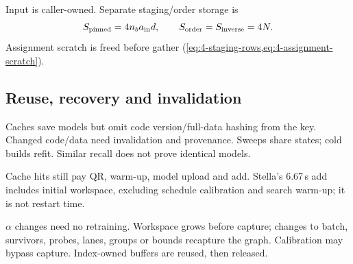 Input is caller-owned. Separate staging/order storage is
\[
 S_{\rm pinned}=4n_ba_{\rm in}d,\qquad
 S_{\rm order}=S_{\rm inverse}=4N.
\]
Assignment scratch is freed before gather (\cref{eq:4-staging-rows,eq:4-assignment-scratch}).

\subsection{Reuse, recovery and invalidation}

Caches save models but omit code version/full-data hashing from the key. Changed code/data need invalidation and provenance. Sweeps share states; cold builds refit. Similar recall does not prove identical models.

Cache hits still pay QR, warm-up, model upload and add. Stella's 6.67\,s add includes initial workspace, excluding schedule calibration and search warm-up; it is not restart time.

$\alpha$ changes need no retraining. Workspace grows before capture; changes to batch, survivors, probes, lanes, groups or bounds recapture the graph. Calibration may bypass capture. Index-owned buffers are reused, then released.